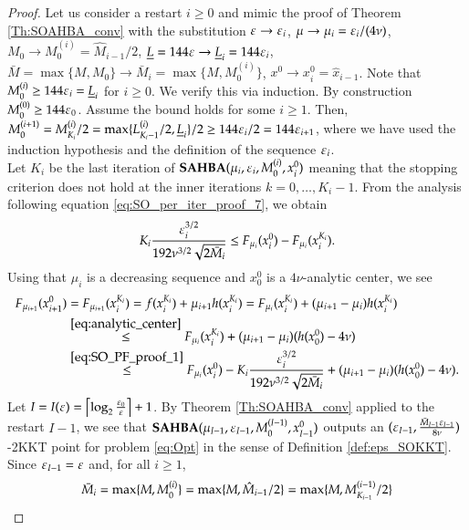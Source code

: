 \begin{proof}
Let us consider a restart $i \geq 0$ and mimic the proof of Theorem \ref{Th:SOAHBA_conv} with the substitution $\varepsilon \to \varepsilon_i$,  $\mu \to \mu_i = \varepsilon_i/(4\nu)$, $M_0 \to M_0^{(i)}=\hat{M}_{i-1}/2$, $\underline{L} = 144  \varepsilon \to \underline{L}_i = 144  \varepsilon_i$, $\bar{M}=\max\{M,M_0\} \to \bar{M}_i=\max\{M,M_0^{(i)}\}$, $x^0 \to x^{0}_{i}=\hat{x}_{i-1}$. Note that $M_0^{(i)} \geq 144 \varepsilon_i=\underline{L}_i$ for $i\geq 0$. We verify this via induction. By construction $M_0^{(0)}\geq 144 \varepsilon_0$. Assume the bound holds for some $i\geq 1$. Then,  $M_0^{(i+1)}=M_{K_{i}}^{(i)}/2=\max\{L_{K_{i}-1}^{(i)}/2,\underline{L}_{i}\}/2\geq 144 \varepsilon_{i}/2=144 \varepsilon_{i+1}$, where we have used the induction hypothesis and the definition of the sequence $\varepsilon_{i}$.\\
Let $K_i$ be the last iteration of $\operatorname{\mathbf{SAHBA}}(\mu_{i},\varepsilon_i,M_0^{(i)},x^{0}_{i})$ meaning that the stopping criterion does not hold at the inner iterations $k=0,\ldots,K_i-1$. From the analysis following equation \eqref{eq:SO_per_iter_proof_7}, we obtain
\begin{equation} \label{eq:SO_PF_proof_1} 
K_i \frac{\varepsilon_i^{3/2}}{192 \nu^{3/2} \sqrt{2\bar{M}_i}} \leq F_{\mu_i}(x^{0}_i)-F_{\mu_i}(x^{K_i}_i).
\end{equation}
Using that $\mu_i$ is a decreasing sequence and $x_{0}^{0}$ is a $4\nu$-analytic center, we see
\begin{align}
F_{\mu_{i+1}}(x^{0}_{i+1})&=F_{\mu_{i+1}}(x^{K_i}_{i})=f(x^{K_i}_{i}) + \mu_{i+1} h(x^{K_i}_{i})=F_{\mu_{i}}(x^{K_i}_{i}) + (\mu_{i+1} - \mu_{i}) h(x^{K_i}_{i}) \notag \\
&\stackrel{\eqref{eq:analytic_center}}{\leq} F_{\mu_{i}}(x^{K_i}_{i}) + (\mu_{i+1} - \mu_{i}) (h(x_0^0)-4\nu)\notag \\
& \stackrel{\eqref{eq:SO_PF_proof_1}}{\leq}F_{\mu_i}(x^{0}_i)-K_i \frac{\varepsilon_i^{3/2}}{192 \nu^{3/2} \sqrt{2\bar{M}_i} }  + (\mu_{i+1} - \mu_{i}) (h(x_0^0)-4\nu).
\label{eq:SO_PF_proof_2} 
\end{align}
Let $I=I(\varepsilon)=\left\lceil \log_2 \frac{\varepsilon_0}{\varepsilon} \right\rceil+1$. By Theorem \ref{Th:SOAHBA_conv} applied to the restart $I-1$, we see that $\operatorname{\mathbf{SAHBA}}(\mu_{I-1},\varepsilon_{I-1},M_0^{(I-1)},x^{0}_{I-1})$ outputs an $(\varepsilon_{I-1},\frac{\bar{M}_{I-1}\varepsilon_{I-1}}{8\nu})$-2KKT point for problem \eqref{eq:Opt} in the sense of Definition \ref{def:eps_SOKKT}. Since $\varepsilon_{I-1}=\varepsilon$ and, for all $i\geq 1$,
\begin{align}
\bar{M}_i &= \max\{M,M_0^{(i)}\} = \max\{M,\hat{M}_{i-1}/2\} = \max\{M,M_{K_{i-1}}^{(i-1)}/2\} \notag\\

\end{align}
\end{proof}
